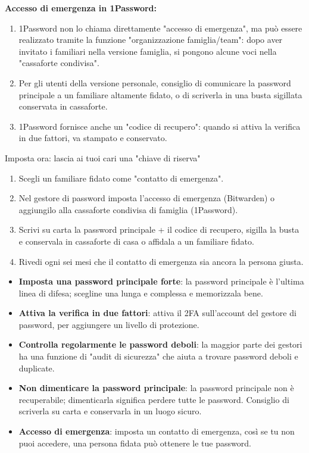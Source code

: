 \textbf{Accesso di emergenza in 1Password:}

\begin{enumerate}
  \item 1Password non lo chiama direttamente "accesso di emergenza", ma può essere realizzato tramite la funzione "organizzazione famiglia/team": dopo aver invitato i familiari nella versione famiglia, si pongono alcune voci nella "cassaforte condivisa".
  \item Per gli utenti della versione personale, consiglio di comunicare la password principale a un familiare altamente fidato, o di scriverla in una busta sigillata conservata in cassaforte.
  \item 1Password fornisce anche un "codice di recupero": quando si attiva la verifica in due fattori, va stampato e conservato.
\end{enumerate}

\begin{tcbpractice}{Imposta ora: lascia ai tuoi cari una "chiave di riserva"}
\begin{enumerate}
  \item Scegli un familiare fidato come "contatto di emergenza".
  \item Nel gestore di password imposta l'accesso di emergenza (Bitwarden) o aggiungilo alla cassaforte condivisa di famiglia (1Password).
  \item Scrivi su carta la password principale + il codice di recupero, sigilla la busta e conservala in cassaforte di casa o affidala a un familiare fidato.
  \item Rivedi ogni sei mesi che il contatto di emergenza sia ancora la persona giusta.
\end{enumerate}

\end{tcbpractice}


\begin{itemize}
  \item \textbf{Imposta una password principale forte}: la password principale è l'ultima linea di difesa; scegline una lunga e complessa e memorizzala bene.
  \item \textbf{Attiva la verifica in due fattori}: attiva il 2FA sull'account del gestore di password, per aggiungere un livello di protezione.
  \item \textbf{Controlla regolarmente le password deboli}: la maggior parte dei gestori ha una funzione di "audit di sicurezza" che aiuta a trovare password deboli e duplicate.
  \item \textbf{Non dimenticare la password principale}: la password principale non è recuperabile; dimenticarla significa perdere tutte le password. Consiglio di scriverla su carta e conservarla in un luogo sicuro.
  \item \textbf{Accesso di emergenza}: imposta un contatto di emergenza, così se tu non puoi accedere, una persona fidata può ottenere le tue password.
\end{itemize}

